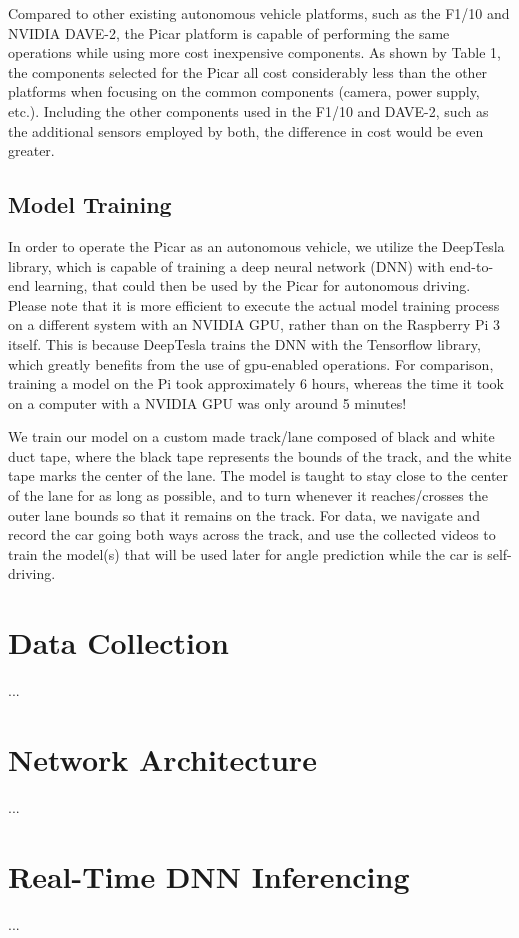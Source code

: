 \documentclass[10pt, conference]{IEEEtran}
\begin{document}
Compared to other existing autonomous vehicle platforms, such as the F1/10 and NVIDIA DAVE-2, the Picar 
platform is capable of performing the same operations while using more cost inexpensive components. As 
shown by Table 1, the components selected for the Picar all cost considerably less than the other 
platforms when focusing on the common components (camera, power supply, etc.). Including the other 
components used in the F1/10 and DAVE-2, such as the additional sensors employed by both, the difference 
in cost would be even greater.

\subsection{Model Training}
In order to operate the Picar as an autonomous vehicle, we utilize the DeepTesla library, which is 
capable of training a deep neural network (DNN) with end-to-end learning, that could then be used by the 
Picar for autonomous driving. Please note that it is more efficient to execute the actual model training 
process on a different system with an NVIDIA GPU, rather than on the Raspberry Pi 3 itself. This is 
because DeepTesla trains the DNN with the Tensorflow library, which greatly benefits from the use of 
gpu-enabled operations. For comparison, training a model on the Pi took approximately 6 hours, whereas 
the time it took on a computer with a NVIDIA GPU was only around 5 minutes! 

We train our model on a custom made track/lane composed of black and white duct tape, where the black 
tape represents the bounds of the track, and the white tape marks the center of the lane. The model is 
taught to stay close to the center of the lane for as long as possible, and to turn whenever it 
reaches/crosses the outer lane bounds so that it remains on the track. For data, we navigate and record 
the car going both ways across the track, and use the collected videos to train the model(s) that will 
be used later for angle prediction while the car is self-driving.

\section{Data Collection}
...
\section{Network Architecture}
...
\section{Real-Time DNN Inferencing}
...
\end{document}
